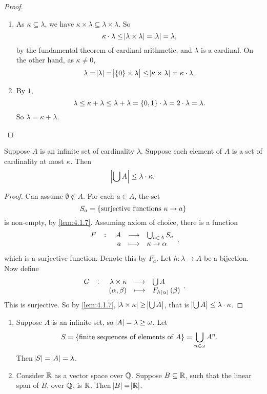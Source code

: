 \begin{proof}
\hfill
\begin{enumerate}
\item As $ \kappa \subseteq \lambda $, we have $ \kappa \times \lambda \subseteq \lambda \times \lambda $. So
$$ \kappa \cdot \lambda \le \abs{\lambda \times \lambda} = \abs{\lambda} = \lambda, $$
by the fundamental theorem of cardinal arithmetic, and $ \lambda $ is a cardinal. On the other hand, as $ \kappa \ne 0 $,
$$ \lambda = \abs{\lambda} = \abs{\cbr{0} \times \lambda} \le \abs{\kappa \times \lambda} = \kappa \cdot \lambda. $$
\item By $ 1 $,
$$ \lambda \le \kappa + \lambda \le \lambda + \lambda = \cbr{0, 1} \cdot \lambda = 2 \cdot \lambda = \lambda. $$
So $ \lambda = \kappa + \lambda $.
\end{enumerate}
\end{proof}

\pagebreak

\begin{theorem}
\label{thm:4.2.6}
Suppose $ A $ is an infinite set of cardinality $ \lambda $. Suppose each element of $ A $ is a set of cardinality at most $ \kappa $. Then
$$ \abs{\bigcup A} \le \lambda \cdot \kappa. $$
\end{theorem}

\begin{proof}
Can assume $ \emptyset \notin A $. For each $ a \in A $, the set
$$ S_a = \cbr{\text{surjective functions} \ \kappa \to a} $$
is non-empty, by \ref{lem:4.1.7}. Assuming axiom of choice, there is a function
$$ \function[F]{A}{\bigcup_{a \in A} S_a}{a}{\kappa \to \alpha}, $$
which is a surjective function. Denote this by $ F_a $. Let $ h : \lambda \to A $ be a bijection. Now define
$$ \function[G]{\lambda \times \kappa}{\bigcup A}{\br{\alpha, \beta}}{F_{h\br{\alpha}}\br{\beta}}. $$
This is surjective. So by \ref{lem:4.1.7}, $ \abs{\lambda \times \kappa} \ge \abs{\bigcup A} $, that is $ \abs{\bigcup A} \le \lambda \cdot \kappa $.
\end{proof}

\begin{example}
\hfill
\begin{enumerate}
\item Suppose $ A $ is an infinite set, so $ \abs{A} = \lambda \ge \omega $. Let
$$ S = \cbr{\text{finite sequences of elements of} \ A} = \bigcup_{n \in \omega} A^n. $$
Then $ \abs{S} = \abs{A} = \lambda $.
\item Consider $ \mathbb{R} $ as a vector space over $ \mathbb{Q} $. Suppose $ B \subseteq \mathbb{R} $, such that the linear span of $ B $, over $ \mathbb{Q} $, is $ \mathbb{R} $. Then $ \abs{B} = \abs{\mathbb{R}} $.
\end{enumerate}
\end{example}

